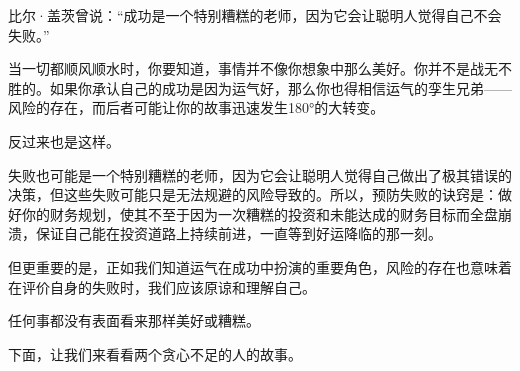 比尔·盖茨曾说：“成功是一个特别糟糕的老师，因为它会让聪明人觉得自己不会失败。”

当一切都顺风顺水时，你要知道，事情并不像你想象中那么美好。你并不是战无不胜的。如果你承认自己的成功是因为运气好，那么你也得相信运气的孪生兄弟——风险的存在，而后者可能让你的故事迅速发生180°的大转变。

反过来也是这样。

失败也可能是一个特别糟糕的老师，因为它会让聪明人觉得自己做出了极其错误的决策，但这些失败可能只是无法规避的风险导致的。所以，预防失败的诀窍是：做好你的财务规划，使其不至于因为一次糟糕的投资和未能达成的财务目标而全盘崩溃，保证自己能在投资道路上持续前进，一直等到好运降临的那一刻。

但更重要的是，正如我们知道运气在成功中扮演的重要角色，风险的存在也意味着在评价自身的失败时，我们应该原谅和理解自己。

任何事都没有表面看来那样美好或糟糕。

下面，让我们来看看两个贪心不足的人的故事。
